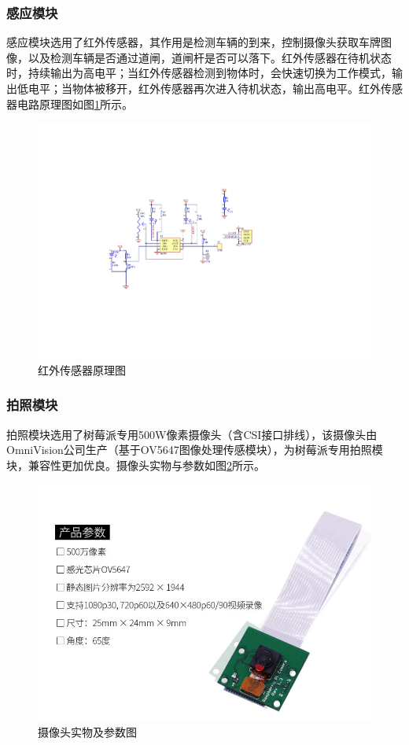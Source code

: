 \subsubsection{感应模块}
感应模块选用了红外传感器，其作用是检测车辆的到来，控制摄像头获取车牌图像，以及检测车辆是否通过道闸，道闸杆是否可以落下。红外传感器在待机状态时，持续输出为高电平；当红外传感器检测到物体时，会快速切换为工作模式，输出低电平；当物体被移开，红外传感器再次进入待机状态，输出高电平。红外传感器电路原理图如图\ref{fig:红外传感器原理图}所示。

\begin{figure}[htbp]
	\centering
	\includegraphics[width=\textwidth]{figure/hardware-red.pdf}
	\caption{红外传感器原理图}\label{fig:红外传感器原理图}
\end{figure}

\subsubsection{拍照模块}
拍照模块选用了树莓派专用500W像素摄像头（含CSI接口排线），该摄像头由OmniVision公司生产（基于OV5647图像处理传感模块），为树莓派专用拍照模块，兼容性更加优良。摄像头实物与参数如图\ref{fig:摄像头实物及参数图}所示。

\begin{figure}[htbp]
	\centering
	\includegraphics[width=\textwidth]{figure/hardware-camera.jpg}
	\caption{摄像头实物及参数图}\label{fig:摄像头实物及参数图}
\end{figure}


